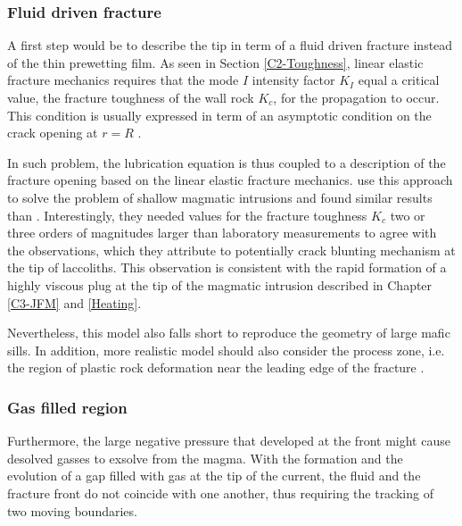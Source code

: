 \subsubsection*{Fluid driven fracture}
\label{sec:caref-descr-tip}

A first step  would be to describe  the tip in term of  a fluid driven
fracture  instead of  the thin  prewetting  film. As  seen in  Section
\ref{C2-Toughness},  linear elastic  fracture mechanics  requires that
the  mode $I$  intensity  factor  $K_I$ equal  a  critical value,  the
fracture toughness  of the wall  rock $K_{c}$, for the  propagation to
occur.  This condition  is usually expressed in term  of an asymptotic
condition      on      the       crack      opening      at      $r=R$
\citep{Savitski:2002gy,Bunger:2005em,Bunger:2007vs,Detournay:2014fk}.

In  such  problem, the  lubrication  equation  is  thus coupled  to  a
description  of  the fracture  opening  based  on the  linear  elastic
fracture mechanics.  \citet{Bunger:2011cb} use  this approach to solve
the problem of  shallow magmatic intrusions and  found similar results
than  \citet{Michaut:2011kg}.  Interestingly,  they needed  values for
the fracture toughness $K_c$ two  or three orders of magnitudes larger
than  laboratory measurements  to agree  with the  observations, which
they attribute to  potentially crack blunting mechanism at  the tip of
laccoliths.  This  observation is consistent with  the rapid formation
of  a  highly viscous  plug  at  the  tip  of the  magmatic  intrusion
described in Chapter \ref{C3-JFM} and \ref{Heating}.

Nevertheless, this model also falls short to reproduce the geometry of
large  mafic sills.   In addition,  more realistic  model should  also
consider the process zone, i.e. the region of plastic rock deformation
near the leading edge of the fracture \citep{Bunger:2008cl}.

\subsubsection*{Gas filled region}
\label{sec:caref-descr-tip}

Furthermore, the large  negative pressure that developed  at the front
might  cause desolved  gasses to  exsolve  from the  magma.  With  the
formation and the evolution of a gap filled with gas at the tip of the
current, the  fluid and the  fracture front  do not coincide  with one
another, thus requiring the tracking of two moving boundaries.

